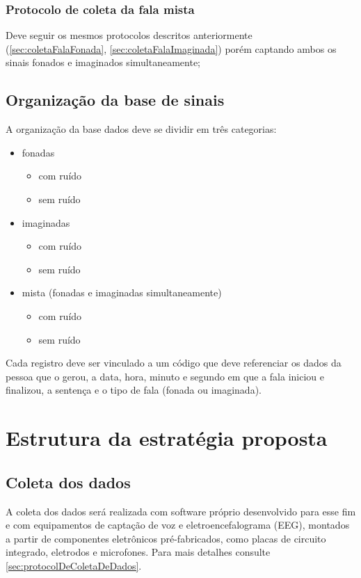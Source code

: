 			\subsubsection{Protocolo de coleta da fala mista}
				\par Deve seguir os mesmos protocolos descritos anteriormente (\autoref{sec:coletaFalaFonada}, \autoref{sec:coletaFalaImaginada}) porém captando ambos os sinais fonados e imaginados simultaneamente;
				

	    \subsection{Organização da base de sinais}
	    	\par A organização da base dados deve se dividir em três categorias:
	    	\begin{itemize}
	    		\item fonadas
	    		\begin{itemize}
	    			\item com ruído
	    			\item sem ruído
	    		\end{itemize}
	    		\item imaginadas
	    		\begin{itemize}
	    			\item com ruído
	    			\item sem ruído
	    		\end{itemize}
	    		\item mista (fonadas e imaginadas simultaneamente)
			    \begin{itemize}
	    			\item com ruído
	    			\item sem ruído
	    		\end{itemize}
	    	\end{itemize}

			\par Cada registro deve ser vinculado a um código que deve referenciar os dados da pessoa que o gerou, a data, hora, minuto e segundo em que a fala iniciou e finalizou, a sentença e o tipo de fala (fonada ou imaginada).

	\section{Estrutura da estratégia proposta}
	
		\subsection{Coleta dos dados}
			\par A coleta dos dados será realizada com software próprio desenvolvido para esse fim e com equipamentos de captação de voz e eletroencefalograma (EEG), montados a partir de componentes eletrônicos pré-fabricados, como placas de circuito integrado, eletrodos e microfones. Para mais detalhes consulte \autoref{sec:protocolDeColetaDeDados}.
	
